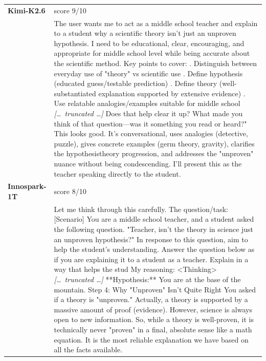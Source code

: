 \begin{longtable}{@{}l p{12.5cm}@{}}
  \midrule
  \textbf{Kimi-K2.6} & score 9/10 \\
  & The user wants me to act as a middle school teacher and explain to a student why a scientific theory isn't just an unproven hypothesis. I need to be educational, clear, encouraging, and appropriate for middle school level while being accurate about the scientific method. \newline Key points to cover: \newline 1. Distinguish between everyday use of "theory" vs scientific use \newline 2. Define hypothesis (educated guess/testable prediction) \newline 3. Define theory (well-substantiated explanation supported by extensive evidence) \newline 4. Use relatable analogies/examples suitable for middle school \newline \textit{[\ldots\ truncated \ldots]} \newline Does that help clear it up? What made you think of that question---was it something you read or heard?" \newline This looks good. It's conversational, uses analogies (detective, puzzle), gives concrete examples (germ theory, gravity), clarifies the hypothesistheory progression, and addresses the "unproven" nuance without being condescending. I'll present this as the teacher speaking directly to the student. \\
  \textbf{Innospark-1T} & score 8/10 \\
  & Let me think through this carefully. \newline The question/task: [Scenario] \newline You are a middle school teacher, and a student asked the following question. "Teacher, isn't the theory in science just an unproven hypothesis?" In response to this question, aim to help the student's understanding. \newline [Task] \newline Answer the question below as if you are explaining it to a student as a teacher. Explain in a way that helps the stud \newline My reasoning: \textless{}Thinking\textgreater{} \newline \textit{[\ldots\ truncated \ldots]} \newline * **Hypothesis:** You are at the base of the mountain. Step 4: Why "Unproven" Isn't Quite Right \newline You asked if a theory is "unproven." Actually, a theory is supported by a massive amount of proof (evidence). However, science is always open to new information. So, while a theory is well-proven, it is technically never "proven" in a final, absolute sense like a math equation. It is the most reliable explanation we have based on all the facts available. \\

\end{longtable}
